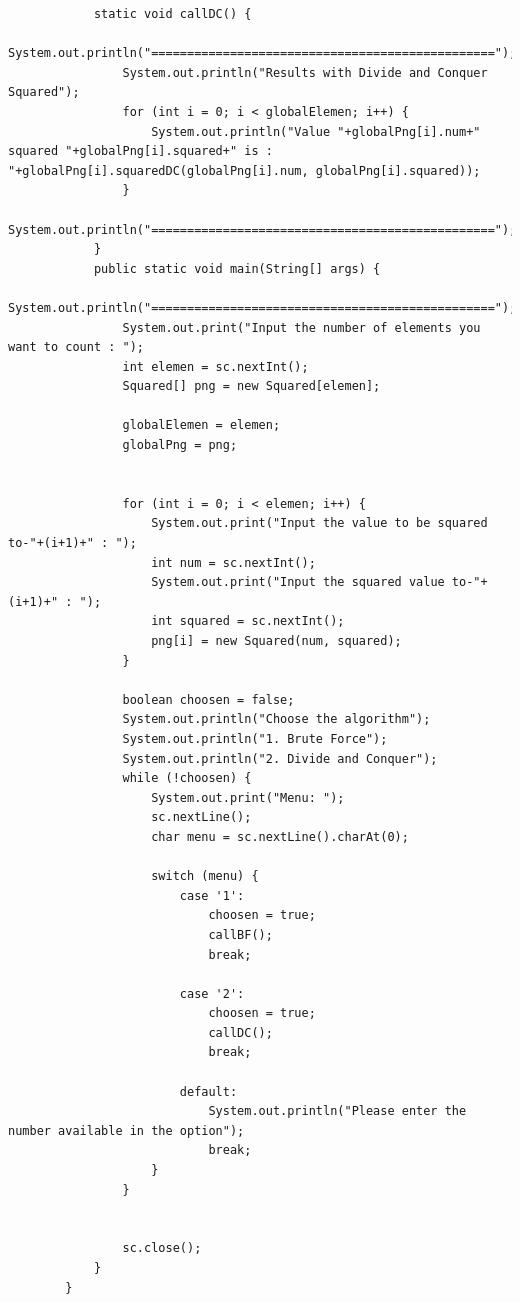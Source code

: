 \documentclass[12pt,titlepage]{article}
\begin{document}
\begin{enumerate}
\begin{verbatim}
            static void callDC() {
                System.out.println("================================================");
                System.out.println("Results with Divide and Conquer Squared");
                for (int i = 0; i < globalElemen; i++) {
                    System.out.println("Value "+globalPng[i].num+" squared "+globalPng[i].squared+" is : "+globalPng[i].squaredDC(globalPng[i].num, globalPng[i].squared));
                }
                System.out.println("================================================");
            }
            public static void main(String[] args) {
                System.out.println("================================================");
                System.out.print("Input the number of elements you want to count : ");
                int elemen = sc.nextInt();
                Squared[] png = new Squared[elemen];

                globalElemen = elemen;
                globalPng = png;
                
                
                for (int i = 0; i < elemen; i++) {
                    System.out.print("Input the value to be squared to-"+(i+1)+" : ");
                    int num = sc.nextInt();
                    System.out.print("Input the squared value to-"+(i+1)+" : ");
                    int squared = sc.nextInt();
                    png[i] = new Squared(num, squared);
                }

                boolean choosen = false;
                System.out.println("Choose the algorithm");
                System.out.println("1. Brute Force");
                System.out.println("2. Divide and Conquer");
                while (!choosen) {
                    System.out.print("Menu: ");
                    sc.nextLine();
                    char menu = sc.nextLine().charAt(0);

                    switch (menu) {
                        case '1':
                            choosen = true;
                            callBF();
                            break;

                        case '2':
                            choosen = true;
                            callDC();
                            break;

                        default:
                            System.out.println("Please enter the number available in the option");
                            break;
                    }
                }


                sc.close();
            }
        }
    \end{verbatim}
\end{enumerate}
\end{document}
